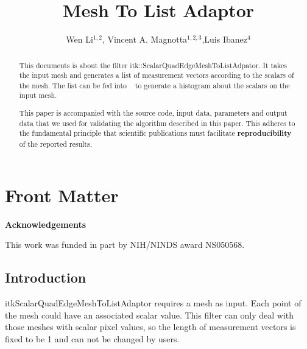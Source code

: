 \documentclass{InsightArticle}
\title{Mesh To List Adaptor}
\author{Wen Li$^{1,2}$, Vincent A. Magnotta$^{1,2,3}$,Luis Ibanez$^{4}$}
\makeatletter
\newcommand\ackname{Acknowledgements}
\newenvironment{acknowledgements}{%
      \titlepage
      \null\vfil
      \@beginparpenalty\@lowpenalty
      \begin{center}%
        \bfseries \ackname
        \@endparpenalty\@M
      \end{center}}%
     {\par\vfil\null\endtitlepage}
\newenvironment{acknowledgements}{%
      \if@twocolumn
        \section*{\abstractname}%
      \else
        \small
        \begin{center}%
          {\bfseries \ackname\vspace{-.5em}\vspace{\z@}}%
        \end{center}%
        \quotation
      \fi}
      {\if@twocolumn\else\endquotation\fi}
\newcommand{\IJhandlerIDnumber}{3117}
\makeatother
\begin{document}
%
% 
\IJhandlefooter{\IJhandlerIDnumber}


\ifpdf
\else
\fi


\maketitle


\ifhtml
\chapter*{Front Matter\label{front}}
\fi


\begin{abstract}
 
This documents is about the filter itk::ScalarQuadEdgeMeshToListAdpator. It takes 
the input mesh and generates a list of measurement vectors according to 
the scalars of the mesh. The list can be fed into 
~\cite{ITKSoftwareGuide,ITKSoftwareGuideSecondEdition}
 to generate a histogram about the scalars on the input mesh.

This paper is accompanied with the source code, input data, parameters and
output data that we used for validating the algorithm described in this paper.
This adheres to the fundamental principle that scientific publications must
facilitate \textbf{reproducibility} of the reported results.
\end{abstract}

\begin{acknowledgements}
This work was funded in part by NIH/NINDS award NS050568.
\end{acknowledgements}

\tableofcontents

\section{Introduction}
itkScalarQuadEdgeMeshToListAdaptor requires a mesh as input. Each point of the mesh
could have an associated scalar value. This filter can only deal with those meshes with
scalar pixel values, so the length of measurement vectors is fixed to be 1 and can not
be changed by users.
\end{document}

